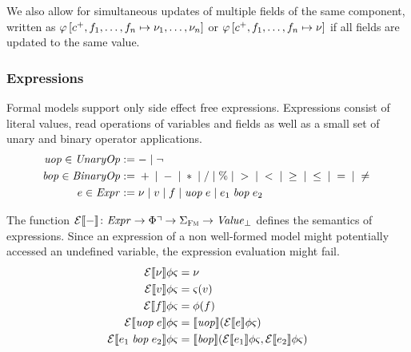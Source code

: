 \documentclass[a4paper,10pt,english]{article}
\begin{document}
We also allow for simultaneous updates of multiple fields of the same component, written as $\varphi\left[c^+,
f_1, \ldots, f_n \mapsto \nu_1, \ldots, \nu_n \right]$ or $\varphi\left[c^+, f_1, \ldots, f_n
\mapsto \nu \right]$ if all fields are updated to the same value.

\subsubsection{Expressions}
Formal models support only side effect free expressions. Expressions consist of literal values, read operations of variables
and fields as well as a small set of unary and binary operator applications.
\begin{align*}
	\mathit{uop} \in \mathit{UnaryOp} & := - \mid \neg
	\\
    \mathit{bop} \in \mathit{BinaryOp} & := {} + {} \mid {} - {} \mid {} \ast {} \mid {} / {}
                       \mid {} \% {} \mid {} > {} \mid {} < {} \mid {} \geq {} 
                       \mid {} \leq {} \mid {} = {} \mid {} \neq {}
	\\
	e \in \mathit{Expr} & := 
		\nu \mid
		v \mid
		f \mid 
		\mathit{uop}\; e \mid
		e_1 \;\mathit{bop}\; e_2
\end{align*}

The function $\mathcal{E} \llbracket - \rrbracket \colon \mathit{Expr} \rightarrow \Phi\urcorner \rightarrow \Sigma_\textsc{Fm} \rightarrow \mathit{Value}_\bot$ defines the
semantics of expressions. Since an expression of a non well-formed model might potentially accessed an undefined variable, the expression
evaluation might fail. 
\begin{align*}
	\mathcal{E} \llbracket \nu \rrbracket \phi \varsigma &= \nu \\
	\mathcal{E} \llbracket v \rrbracket \phi \varsigma &= \varsigma(v) \\
	\mathcal{E} \llbracket f \rrbracket \phi \varsigma &= \phi(f) \\
	\mathcal{E} \llbracket \mathit{uop}\; e \rrbracket \phi \varsigma &= \llbracket \mathit{uop} \rrbracket (\mathcal{E} \llbracket e \rrbracket \phi
	\varsigma) \\
	\mathcal{E} \llbracket e_1 \;\mathit{bop}\; e_2 \rrbracket \phi \varsigma &= \llbracket \mathit{bop} \rrbracket
	(\mathcal{E} \llbracket e_1 \rrbracket \phi \varsigma, \mathcal{E} \llbracket e_2 \rrbracket \phi \varsigma)
\end{align*}
\end{document}
